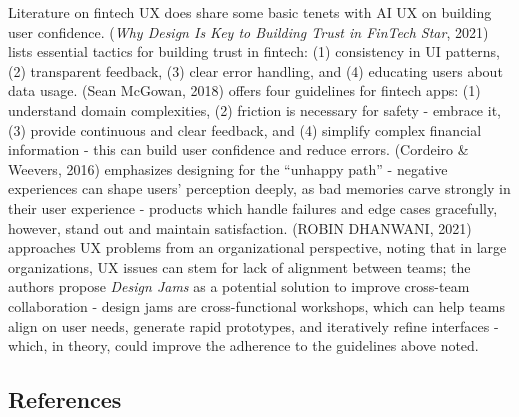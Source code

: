 \documentclass[
  letterpaper,
  DIV=11,
  numbers=noendperiod]{scrartcl}
\begin{document}
Literature on fintech UX does share some basic tenets with AI UX on
building user confidence. (\emph{Why Design Is Key to Building Trust in
{FinTech} {\textbar} {Star}}, 2021) lists essential tactics for building
trust in fintech: (1) consistency in UI patterns, (2) transparent
feedback, (3) clear error handling, and (4) educating users about data
usage. (Sean McGowan, 2018) offers four guidelines for fintech apps: (1)
understand domain complexities, (2) friction is necessary for safety -
embrace it, (3) provide continuous and clear feedback, and (4) simplify
complex financial information - this can build user confidence and
reduce errors. (Cordeiro \& Weevers, 2016) emphasizes designing for the
``unhappy path'' - negative experiences can shape users' perception
deeply, as bad memories carve strongly in their user experience -
products which handle failures and edge cases gracefully, however, stand
out and maintain satisfaction. (ROBIN DHANWANI, 2021) approaches UX
problems from an organizational perspective, noting that in large
organizations, UX issues can stem for lack of alignment between teams;
the authors propose \emph{Design Jams} as a potential solution to
improve cross-team collaboration - design jams are cross-functional
workshops, which can help teams align on user needs, generate rapid
prototypes, and iteratively refine interfaces - which, in theory, could
improve the adherence to the guidelines above noted.

\subsection{References}\label{references}
\end{document}
